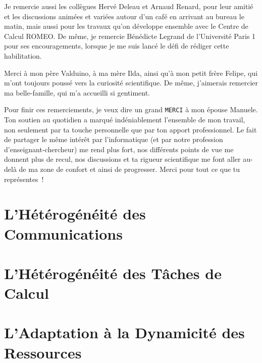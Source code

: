 \documentclass[final,twoside]{hdr} %
\begin{document}
Je remercie aussi les collègues Hervé Deleau et Arnaud Renard, pour leur amitié et les discussions animées et variées autour d'un café en arrivant au bureau le matin, mais aussi pour les travaux qu'on développe ensemble avec le Centre de Calcul ROMEO. %
De même, je remercie Bénédicte Legrand de l'Université Paris 1 pour ses encouragements, lorsque je me suis lancé le défi de rédiger cette habilitation. 

Merci à mon père Valduino, à ma mère Ilda, ainsi qu'à mon petit frère Felipe, qui m'ont toujours poussé vers la curiosité scientifique. De même, j'aimerais remercier ma belle-famille, qui m'a accueilli si gentiment. 

Pour finir ces remerciements, je veux dire un grand \texttt{MERCI} à mon épouse Manuele. Ton soutien au quotidien a marqué indéniablement l'ensemble de mon travail, non seulement par ta touche personnelle que par ton apport professionnel. Le fait de partager le même intérêt par l'informatique (et par notre profession d'enseignant-chercheur) me rend plus fort, nos différents points de vue me donnent plus de recul, nos discussions et ta rigueur scientifique me font aller au-delà de ma zone de confort et ainsi de progresser. Merci pour tout ce que tu représentes\ ! 


\tableofcontents






\chapter{L'Hétérogénéité des Communications\label{chap:grids}}



\chapter{L'Hétérogénéité des Tâches de Calcul\label{chap:amide}}



\chapter{L'Adaptation à la Dynamicité des Ressources\label{chap:hadoop}}
\end{document}
